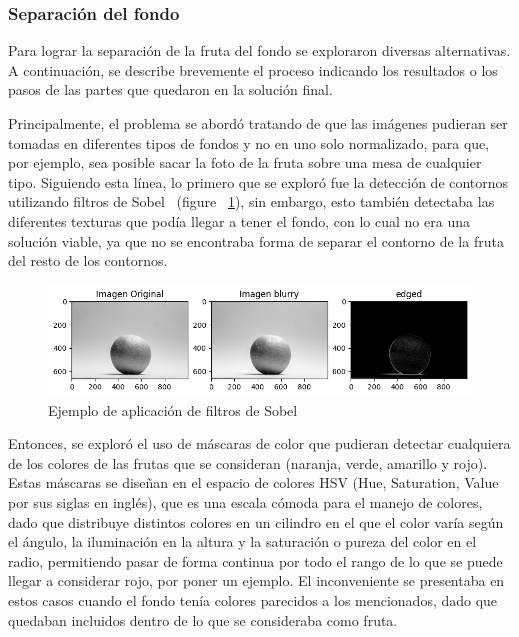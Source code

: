 \documentclass[a4paper, 12pt]{article}
\begin{document}
\subsubsection{Separación del fondo}

Para lograr la separación de la fruta del fondo se exploraron diversas alternativas. A continuación, se describe brevemente el proceso indicando los resultados o los pasos de las partes que quedaron en la solución final.

Principalmente, el problema se abordó tratando de que las imágenes pudieran ser tomadas en diferentes tipos de fondos y no en uno solo normalizado, para que, por ejemplo, sea posible sacar la foto de la fruta sobre una mesa de cualquier tipo. Siguiendo esta línea, lo primero que se exploró fue la detección de contornos utilizando filtros de Sobel~\cite{sobel} (figure ~\ref{SOBEL}), sin embargo, esto también detectaba las diferentes texturas que podía llegar a tener el fondo, con lo cual no era una solución viable, ya que no se encontraba forma de separar el contorno de la fruta del resto de los contornos.
\begin{figure}[!htbp]
    \centering
    \includegraphics[width=0.6\linewidth]{SOBEL.png}
    \caption{Ejemplo de aplicación de filtros de Sobel}
    \label{SOBEL}
\end{figure}
Entonces, se exploró el uso de máscaras de color que pudieran detectar cualquiera de los colores de las frutas que se consideran (naranja, verde, amarillo y rojo). Estas máscaras se diseñan en el espacio de colores HSV (Hue, Saturation, Value por sus siglas en inglés), que es una escala cómoda para el manejo de colores, dado que distribuye distintos colores en un cilindro en el que el color varía según el ángulo, la iluminación en la altura y la saturación o pureza del color en el radio, permitiendo pasar de forma continua por todo el rango de lo que se puede llegar a considerar rojo, por poner un ejemplo. El inconveniente se presentaba en estos casos cuando el fondo tenía colores parecidos a los mencionados, dado que quedaban incluidos dentro de lo que se consideraba como fruta.
\end{document}
